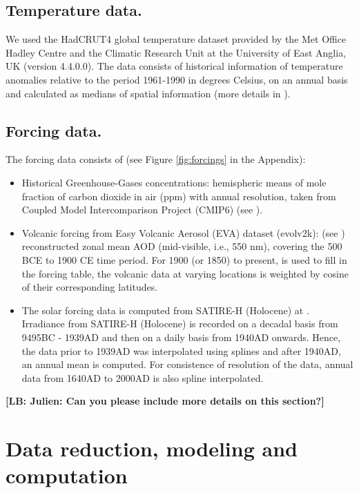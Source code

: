 \documentclass[11pt]{amsart}
\theoremstyle{plain}
\theoremstyle{definition}
\theoremstyle{remark}
\newcommand{\lb}[1]{\color{MidnightBlue}\textbf{[LB: #1]}\normalcolor}
\begin{document}
\subsection{Temperature data.}
We used the HadCRUT4 global temperature dataset provided by the Met Office Hadley
Centre and the Climatic Research Unit at the University of East Anglia, UK (version 4.4.0.0). The
data consists of historical information of temperature anomalies relative to the
period 1961-1990 in degrees Celsius, on an annual basis and calculated as
medians of spatial information (more details in \cite{Morice2012}).

\subsection{Forcing data.}
The forcing data consists of (see Figure \ref{fig:forcings} in the Appendix):
\begin{itemize}
\item Historical Greenhouse-Gases concentrations: hemispheric means of mole
  fraction of carbon dioxide in air (ppm) with annual
  resolution, taken from Coupled Model Intercomparison Project (CMIP6) (see
  \cite{Meinshausen2016}).
  
\item Volcanic forcing from Easy Volcanic Aerosol (EVA) dataset (evolv2k): (see
  \cite{Toohey2016}) reconstructed zonal mean AOD (mid-visible, i.e., 550 nm), covering the
  500 BCE to 1900 CE time period. For 1900 (or 1850) to present, \cite{Thomason2016} is
  used to fill in the forcing table, the volcanic data at varying locations is
  weighted by cosine of their corresponding latitudes.
  
\item The solar forcing data is computed from SATIRE-H
  (Holocene) at \cite{Vieira2011}. Irradiance from SATIRE-H (Holocene) is
  recorded on a decadal basis from 9495BC - 1939AD and then on a daily basis
  from 1940AD onwards. Hence, the data prior to 1939AD was interpolated using splines and after 1940AD, an annual mean is computed. For consistence of resolution of the data, annual data from 1640AD to 2000AD is also spline interpolated.
\end{itemize}
\lb{Julien: Can you please include more details on this section?}

\section{Data reduction, modeling and computation}\label{sec:model}
\end{document}

